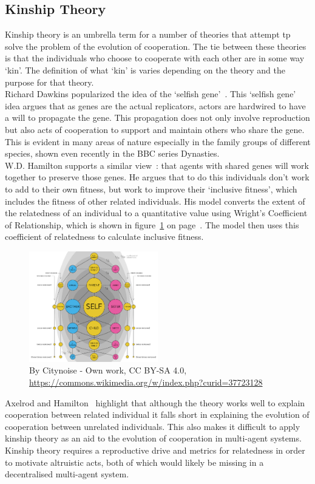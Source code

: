 \documentclass[twoside,twocolumn]{article}
\begin{document}
\subsection{Kinship Theory}
Kinship theory is an umbrella term for a number of theories that attempt tp solve the problem of the evolution of cooperation. The tie between these theories is that the individuals who choose to cooperate with each other are in some way `kin'. The definition of what `kin' is varies depending on the theory and the purpose for that theory.\\
Richard Dawkins popularized the idea of the `selfish gene'~\cite{selfish_gene}. This `selfish gene' idea argues that as genes are the actual replicators, actors are hardwired to have a will to propagate the gene. This propagation does not only involve reproduction but also acts of cooperation to support and maintain others who share the gene. This is evident in many areas of nature especially in the family groups of different species, shown even recently in the BBC series Dynasties.\\
W.D. Hamilton supports a similar view~\cite{kinhamilton}: that agents with shared genes will work together to preserve those genes. He argues that to do this individuals don't work to add to their own fitness, but work to improve their `inclusive fitness', which includes the fitness of other related individuals. His model converts the extent of the relatedness of an individual to a quantitative value using Wright's Coefficient of Relationship, which is shown in figure~\ref{fig:coefrelate} on page~\pageref{fig:coefrelate}. The model then uses this coefficient of relatedness to calculate inclusive fitness.\\
\begin{figure}
	\includegraphics[width=0.5\textwidth]{coefrelate.png}
	\caption{By Citynoise - Own work, CC BY-SA 4.0, \url{https://commons.wikimedia.org/w/index.php?curid=37723128}}
	\label{fig:coefrelate}
\end{figure}
Axelrod and Hamilton~\cite{evolution_of_cooperation} highlight that although the theory works well to explain cooperation between related individual it falls short in explaining the evolution of cooperation between unrelated individuals. This also makes it difficult to apply kinship theory as an aid to the evolution of cooperation in multi-agent systems. Kinship theory requires a reproductive drive and metrics for relatedness in order to motivate altruistic acts, both of which would likely be missing in a decentralised multi-agent system.
\end{document}
